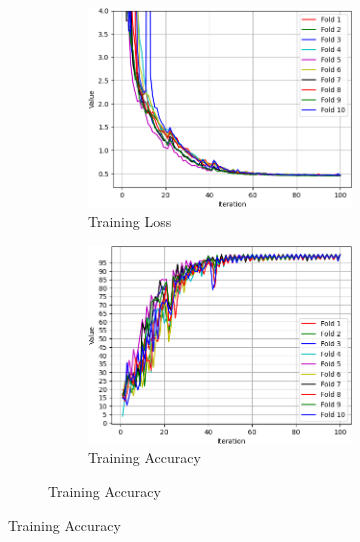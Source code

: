 \begin{figure}[ht]
    \centering
    \begin{subfigure}{\textwidth} 
        \centering
        \begin{subfigure}{0.32\textwidth}
            \includegraphics[width=\linewidth]{Images/training/BU3DFE_6_train_loss.png}
            \caption{Training Loss}
            \label{BU3DFE_6_train_loss}
        \end{subfigure}
        \begin{subfigure}{0.32\textwidth}
            \includegraphics[width=\linewidth]{Images/training/BU3DFE_6_train_acc.png}
            \caption{Training Accuracy}
            \label{BU3DFE_6_train_acc}
        \end{subfigure}

\end{subfigure}
\end{figure}
